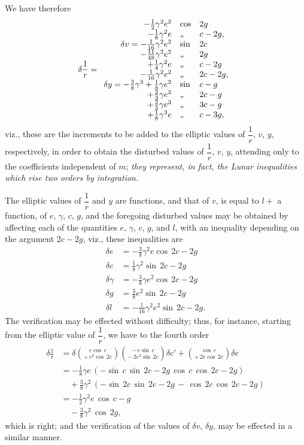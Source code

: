 \documentclass[11pt]{article}
\begin{document}
We have therefore
\[
\delta\frac{1}{r} =
\begin{array}{r@{\quad}l@{\quad}l}
 - \tfrac{1}{2}\gamma^{2}e^{2} & \cos & 2g \\
 - \tfrac{1}{8}\gamma^{2}e & \text{,,} & c - 2g, \\
\delta v = - \tfrac{1}{16}\gamma^{2}e^{2} & \sin & 2c \\
 - \tfrac{11}{48}\gamma^{2}e^{2} & \text{,,} & 2g \\
 + \tfrac{1}{4}\gamma^{2}e & \text{,,} & c - 2g \\
 - \tfrac{1}{16}\gamma^{2}e^{2} & \text{,,} & 2c - 2g, \\
\delta y = - \tfrac{3}{8}\gamma^{3} + \tfrac{1}{8}\gamma e^{2} & \sin & c - g \\
 + \tfrac{2}{3}\gamma e^{2} & \text{,,} & 2c - g \\
 + \tfrac{2}{3}\gamma e^{3} & \text{,,} & 3c - g \\
 + \tfrac{1}{8}\gamma^{3}e & \text{,,} & c - 3g,
\end{array}
\]
viz., these are the increments to be added to the elliptic values of
$\dfrac{1}{r}$, $v$, $y$, respectively, in order to obtain the
disturbed values of $\dfrac{1}{r}$, $v$, $y$, attending only to the
coefficients independent of $m$; \textit{they represent, in fact, the
Lunar inequalities which rise two orders by integration.}

The elliptic values of $\dfrac{1}{r}$ and $y$ are functions, and that
of $v$, is equal to $l +$ a function, of $e$, $\gamma$, $c$, $g$, and
the foregoing disturbed values may be obtained by affecting each of
the quantities $e$, $\gamma$, $c$, $g$, and $l$, with an inequality
depending on the argument $2c - 2g$, viz., these inequalities are
\begin{align*}
\delta e &= - \tfrac{3}{8}\gamma^{2}e \cos\,2c - 2g \\
\delta c &= \tfrac{1}{8}\gamma^{2} \sin\,2c - 2g \\
\delta\gamma &= - \tfrac{3}{8}\gamma e^{2} \cos\,2c - 2g \\
\delta g &= \tfrac{3}{8}e^{2} \sin\,2c - 2g \\
\delta l &= - \tfrac{1}{16}\gamma^{2}e^{2} \sin\,2c - 2g.
\end{align*}
The verification may be effected without difficulty; thus, for
instance, starting from the elliptic value of $\dfrac{1}{r}$, we have
to the fourth order
\begin{align*}
\delta\frac{1}{r} &= \delta\!\binom{e\cos\, c}{+\, e^{2}\cos\, 2c}
   \binom{-\,e\sin\, c}{-\,2e^{2}\sin\, 2c}\delta c'
   + \binom{\cos\, c}{+\,2e\cos\, 2c}\delta e \\
&= - \tfrac{1}{8}\gamma e\,(-\sin\, c\,\sin\, 2c - 2g\,\cos\, c\,\cos\, 2c - 2g) \\
&\quad + \tfrac{3}{8}\gamma^{2}\,(-\sin\, 2c\,\sin\, 2c - 2g\,-\,\cos\, 2c\,\cos\, 2c - 2g) \\
&= - \tfrac{1}{2}\gamma^{2}e\,\cos\, c - g \\
&\quad - \tfrac{3}{8}\gamma^{2}\,\cos\, 2g,
\end{align*}
which is right; and the verification of the values of $\delta v$,
$\delta y$, may be effected in a similar manner.
\end{document}
